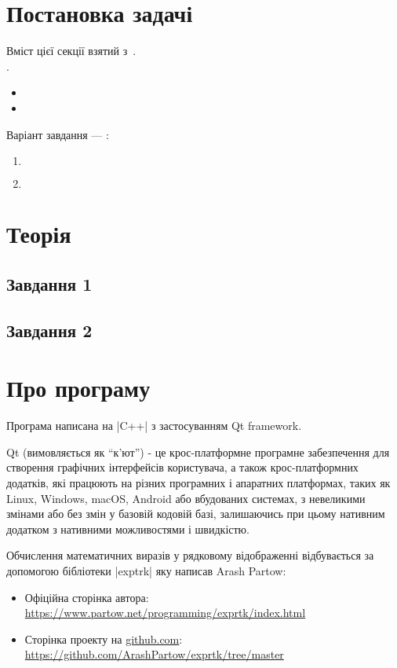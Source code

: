 \documentclass[../../../../document]{subfiles}
\begin{document}
	\chapter{Постановка задачі}
	Вміст цієї секції взятий з~\cite{computational_methods}.\\
	 \worktheme.\\
	\begin{itemize}
		\item
		\item
	\end{itemize}
	Варіант завдання --- \studentnumber:
	\begin{enumerate}
		\item
			\begin{gather}
			\end{gather}
		\item
			\begin{gather}
			\end{gather}
	\end{enumerate}

	\chapter{Теорія}
	\section{Завдання 1}
	\label{sec:prb1thr}

	\section{Завдання 2}
	\label{sec:prb2thr}

	\chapter{Про програму}
	Програма написана на \textinline|C++| з застосуванням Qt framework.

	Qt (вимовляється як \enquote{к'ют}) - це крос-платформне
	програмне забезпечення для створення графічних інтерфейсів користувача, а також
	крос-платформних додатків, які працюють на різних програмних і апаратних
	платформах, таких як Linux, Windows, macOS, Android або вбудованих системах, з
	невеликими змінами або без змін у базовій кодовій базі, залишаючись при цьому
	нативним додатком з нативними можливостями і швидкістю.
	
	Обчислення математичних виразів у рядковому відображенні відбувається за допомогою бібліотеки \textinline|exptrk| яку написав Arash Partow:
	\begin{itemize}
		\item Офіційна сторінка автора: \url{https://www.partow.net/programming/exprtk/index.html}
		\item Сторінка проекту на \url{github.com}: \url{https://github.com/ArashPartow/exprtk/tree/master}
	\end{itemize}
\end{document}
